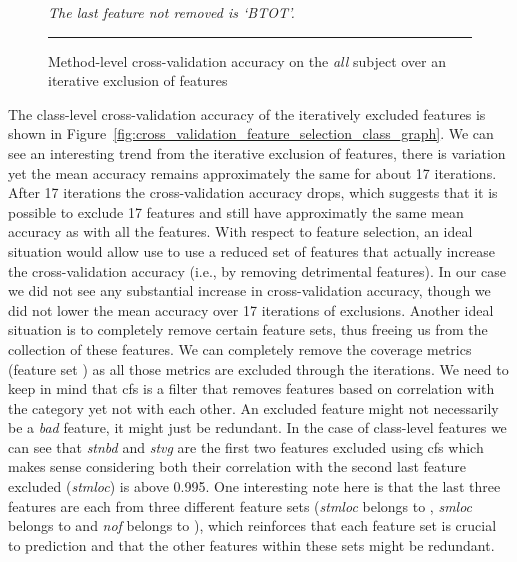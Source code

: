 \begin{figure}[ht!]
  \centering
  \begin{adjustbox}{max size={.95\textwidth}{.95\textheight}}
    
  \end{adjustbox}
  \caption{Method-level cross-validation accuracy on the \emph{all} subject over an iterative exclusion of features}
  \vspace{1mm}
  \footnotesize{\emph{The last feature not removed is `BTOT'.}}
  \vspace{2mm}
  \hrule
  \label{fig:cross_validation_feature_selection_method_graph}
\end{figure}

The class-level cross-validation accuracy of the iteratively excluded features is shown in Figure~\ref{fig:cross_validation_feature_selection_class_graph}. We can see an interesting trend from the iterative exclusion of features, there is variation yet the mean accuracy remains approximately the same for about 17 iterations. After 17 iterations the cross-validation accuracy drops, which suggests that it is possible to exclude 17 features and still have approximatly the same mean accuracy as with all the features. With respect to feature selection, an ideal situation would allow use to use a reduced set of features that actually increase the cross-validation accuracy (i.e., by removing detrimental features). In our case we did not see any substantial increase in cross-validation accuracy, though we did not lower the mean accuracy over 17 iterations of exclusions. Another ideal situation is to completely remove certain feature sets, thus freeing us from the collection of these features. We can completely remove the coverage metrics (feature set ) as all those metrics are excluded through the iterations. We need to keep in mind that \gls{cfs} is a filter that removes features based on correlation with the category yet not with each other. An excluded feature might not necessarily be a \emph{bad} feature, it might just be redundant. In the case of class-level features we can see that \emph{stnbd} and \emph{stvg} are the first two features excluded using \gls{cfs} which makes sense considering both their correlation with the second last feature excluded (\emph{stmloc}) is above 0.995. One interesting note here is that the last three features are each from three different feature sets (\emph{stmloc} belongs to , \emph{smloc} belongs to  and \emph{nof} belongs to ), which reinforces that each feature set is crucial to prediction and that the other features within these sets might be redundant.

